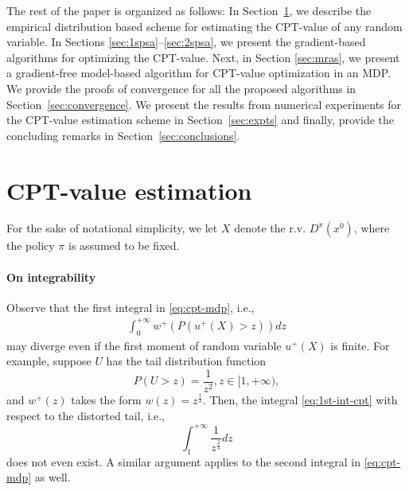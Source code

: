 \documentclass[11pt,letterpaper,english]{article}
\begin{document}
The rest of the paper is organized as follows: In Section~\ref{sec:cpt-sampling}, we
describe the empirical distribution based scheme for estimating the CPT-value of any random variable. In Sections \ref{sec:1spsa}--\ref{sec:2spsa}, we present the gradient-based algorithms for optimizing the CPT-value. Next, in Section \ref{sec:mras}, we present a gradient-free model-based algorithm for CPT-value optimization in an MDP. We provide the proofs of convergence for all the proposed algorithms in Section~\ref{sec:convergence}.
We present the results from numerical experiments for the CPT-value estimation scheme in Section~\ref{sec:expts} and finally, provide the concluding remarks in Section~\ref{sec:conclusions}.


\section{CPT-value estimation} 
\label{sec:cpt-sampling}

For the sake of notational simplicity, we let $X$ denote the r.v. $D^\pi(x^0)$, where the policy $\pi$ is assumed to be fixed. 

\paragraph{On integrability}
Observe that the first integral in \eqref{eq:cpt-mdp}, i.e., 
\begin{align}
\label{eq:1st-int-cpt}
\int_0^{+\infty} w^+(P(u^+(X)>z)) d z
\end{align}
may diverge even if the first moment of random variable $u^+(X)$ is finite. 
For example, suppose $U$ has the tail distribution function
$$P(U>z)  = \frac{1}{z^2}, z\in [1, +\infty),$$
and $w^+(z)$ takes the form $w(z) = z^{\frac{1}{3}}$. Then, the integral \eqref{eq:1st-int-cpt} with respect to the distorted tail, i.e.,
$$
\int_1^{+\infty} \frac{1}{z^{\frac{2}{3}}} dz
$$
does not even exist. A similar argument applies to the second integral in \eqref{eq:cpt-mdp} as well.
\end{document}
